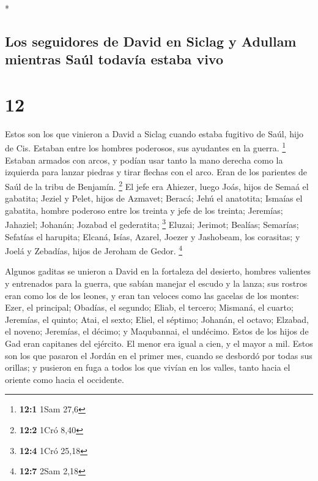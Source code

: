 \begin{paracol}{2}
\begin{otherlanguage}{english}
\end{otherlanguage}

\switchcolumn[0]*

\hypertarget{los-seguidores-de-david-en-siclag-y-adullam-mientras-sauxfal-todavuxeda-estaba-vivo}{%
\subsection{Los seguidores de David en Siclag y Adullam mientras Saúl
todavía estaba
vivo}\label{los-seguidores-de-david-en-siclag-y-adullam-mientras-sauxfal-todavuxeda-estaba-vivo}}

\hypertarget{section-22}{%
\section{12}\label{section-22}}

 Estos son los que vinieron a David a Siclag cuando estaba
fugitivo de Saúl, hijo de Cis. Estaban entre los hombres poderosos, sus
ayudantes en la guerra. \footnote{\textbf{12:1} 1Sam 27,6}
 Estaban armados con arcos, y podían usar tanto la mano
derecha como la izquierda para lanzar piedras y tirar flechas con el
arco. Eran de los parientes de Saúl de la tribu de Benjamín. \footnote{\textbf{12:2}
  1Cró 8,40}  El jefe era Ahiezer, luego Joás, hijos de
Semaá el gabatita; Jeziel y Pelet, hijos de Azmavet; Beracá; Jehú el
anatotita;  Ismaías el gabatita, hombre poderoso entre los
treinta y jefe de los treinta; Jeremías; Jahaziel; Johanán; Jozabad el
gederatita; \footnote{\textbf{12:4} 1Cró 25,18}  Eluzai;
Jerimot; Bealías; Semarías; Sefatías el harupita;  Elcaná,
Isías, Azarel, Joezer y Jashobeam, los corasitas;  y Joelá
y Zebadías, hijos de Jeroham de Gedor. \footnote{\textbf{12:7} 2Sam 2,18}

 Algunos gaditas se unieron a David en la fortaleza del
desierto, hombres valientes y entrenados para la guerra, que sabían
manejar el escudo y la lanza; sus rostros eran como los de los leones, y
eran tan veloces como las gacelas de los montes:  Ezer, el
principal; Obadías, el segundo; Eliab, el tercero; 
Mismaná, el cuarto; Jeremías, el quinto;  Atai, el sexto;
Eliel, el séptimo;  Johanán, el octavo; Elzabad, el
noveno;  Jeremías, el décimo; y Maqubannai, el undécimo.
 Estos de los hijos de Gad eran capitanes del ejército.
El menor era igual a cien, y el mayor a mil.  Estos son
los que pasaron el Jordán en el primer mes, cuando se desbordó por todas
sus orillas; y pusieron en fuga a todos los que vivían en los valles,
tanto hacia el oriente como hacia el occidente.


\end{paracol}
